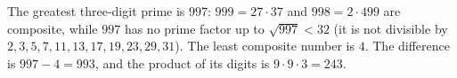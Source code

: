 The greatest three-digit prime is $997$: $999=27\cdot37$ and $998=2\cdot499$ are composite, while $997$ has no prime factor up to $\sqrt{997}<32$ (it is not divisible by $2,3,5,7,11,13,17,19,23,29,31$). The least composite number is $4$. The difference is $997-4=993$, and the product of its digits is $9\cdot9\cdot3=\boxed{243}$.

